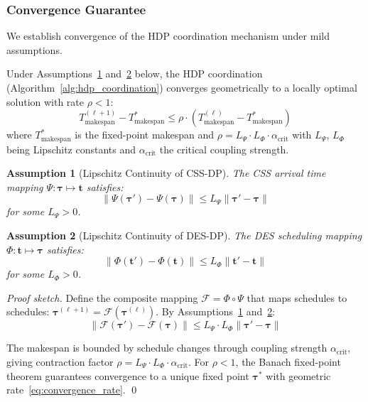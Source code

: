 \documentclass[manuscript,screen,review]{acmart}
\newtheorem{assumption}{Assumption}
\begin{document}
\subsubsection{Convergence Guarantee}

We establish convergence of the HDP coordination mechanism under mild 
assumptions.

\begin{theorem}
Under Assumptions~\ref{ass:lipschitz_css} and~\ref{ass:lipschitz_des} below, 
the HDP coordination (Algorithm~\ref{alg:hdp_coordination}) converges 
geometrically to a locally optimal solution with rate $\rho < 1$:
\begin{equation}
T_{\text{makespan}}^{(\ell+1)} - T_{\text{makespan}}^* \leq \rho \cdot (T_{\text{makespan}}^{(\ell)} - T_{\text{makespan}}^*)
\label{eq:convergence_rate}
\end{equation}
where $T_{\text{makespan}}^*$ is the fixed-point makespan and $\rho = L_{\Psi} \cdot L_{\Phi} \cdot \alpha_{\text{crit}}$ 
with $L_{\Psi}$, $L_{\Phi}$ being Lipschitz constants and $\alpha_{\text{crit}}$ 
the critical coupling strength.
\label{thm:convergence}
\end{theorem}

\begin{assumption}[Lipschitz Continuity of CSS-DP]
The CSS arrival time mapping $\Psi: \boldsymbol{\tau} \mapsto \mathbf{t}$ 
satisfies:
\begin{equation}
\|\Psi(\boldsymbol{\tau}') - \Psi(\boldsymbol{\tau})\| \leq L_{\Psi} \|\boldsymbol{\tau}' - \boldsymbol{\tau}\|
\end{equation}
for some $L_{\Psi} > 0$.
\label{ass:lipschitz_css}
\end{assumption}

\begin{assumption}[Lipschitz Continuity of DES-DP]
The DES scheduling mapping $\Phi: \mathbf{t} \mapsto \boldsymbol{\tau}$ 
satisfies:
\begin{equation}
\|\Phi(\mathbf{t}') - \Phi(\mathbf{t})\| \leq L_{\Phi} \|\mathbf{t}' - \mathbf{t}\|
\end{equation}
for some $L_{\Phi} > 0$.
\label{ass:lipschitz_des}
\end{assumption}

\begin{proof}[Proof sketch]
Define the composite mapping $\mathcal{F} = \Phi \circ \Psi$ that maps 
schedules to schedules: $\boldsymbol{\tau}^{(\ell+1)} = \mathcal{F}(\boldsymbol{\tau}^{(\ell)})$. 
By Assumptions~\ref{ass:lipschitz_css} and~\ref{ass:lipschitz_des}:
\begin{equation}
\|\mathcal{F}(\boldsymbol{\tau}') - \mathcal{F}(\boldsymbol{\tau})\| \leq L_{\Psi} \cdot L_{\Phi} \|\boldsymbol{\tau}' - \boldsymbol{\tau}\|
\end{equation}

The makespan is bounded by schedule changes through coupling strength 
$\alpha_{\text{crit}}$, giving contraction factor $\rho = L_{\Psi} \cdot L_{\Phi} \cdot \alpha_{\text{crit}}$. 
For $\rho < 1$, the Banach fixed-point theorem guarantees convergence to a 
unique fixed point $\boldsymbol{\tau}^*$ with geometric rate~\eqref{eq:convergence_rate}. 
\qed
\end{proof}
\end{document}
